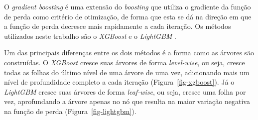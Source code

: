 \begin{apendicesenv}
O \emph{gradient boosting} é uma extensão do \emph{boosting} que utiliza
o gradiente da função de perda como critério de otimização, de forma que
esta se dá na direção em que a função de perda decresce mais rapidamente
a cada iteração. Os métodos utilizados neste trabalho são o
\emph{XGBoost} \autocite{chen_xgboost_2016} e o \emph{LightGBM}
\autocite{ke_lightgbm_2017}.

Um das principais diferenças entre os dois métodos é a forma como as
árvores são construídas. O \emph{XGBoost} cresce suas árvores de forma
\emph{level-wise}, ou seja, cresce todas as folhas do último nível de
uma árvore de uma vez, adicionando mais um nível de profundidade
completo a cada iteração (Figura~\ref{fig-xgboost}). Já o
\emph{LightGBM} cresce suas árvores de forma \emph{leaf-wise}, ou seja,
cresce uma folha por vez, aprofundando a árvore apenas no nó que resulta
na maior variação negativa na função de perda
(Figura~\ref{fig-lightgbm}).

\begin{figure}

\begin{minipage}[t]{\linewidth}

{\centering 


}

\end{minipage}%
\newline
\begin{minipage}[t]{\linewidth}

{\centering 

}
\end{minipage}
\end{figure}
\end{apendicesenv}
